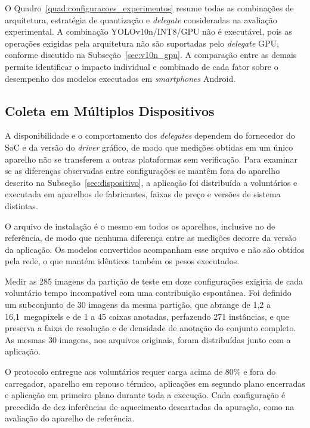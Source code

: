 \documentclass[artigo,times,capa]{iftex2024}
\begin{document}
O Quadro~\ref{quad:configuracoes_experimentos} resume todas as combinações de arquitetura, estratégia de quantização e \textit{delegate} consideradas na avaliação experimental. A combinação YOLOv10n/\ac{INT8}/\ac{GPU} não é executável, pois as operações exigidas pela arquitetura não são suportadas pelo \textit{delegate} \ac{GPU}, conforme discutido na Subseção~\ref{sec:v10n_gpu}. A comparação entre as demais permite identificar o impacto individual e combinado de cada fator sobre o desempenho dos modelos executados em \textit{smartphones} Android.

\subsection{Coleta em Múltiplos Dispositivos}
\label{sec:coleta_multidispositivo}

A disponibilidade e o comportamento dos \textit{delegates} dependem do
fornecedor do \ac{SoC} e da versão do \textit{driver} gráfico, de modo que
medições obtidas em um único aparelho não se transferem a outras plataformas
sem verificação. Para examinar se as diferenças observadas entre configurações
se mantêm fora do aparelho descrito na Subseção~\ref{sec:dispositivo}, a
aplicação foi distribuída a voluntários e executada em aparelhos de
fabricantes, faixas de preço e versões de sistema distintas.

O arquivo de instalação é o mesmo em todos os aparelhos, inclusive no de
referência, de modo que nenhuma diferença entre as medições decorre da versão
da aplicação. Os modelos convertidos acompanham esse arquivo e não são obtidos
pela rede, o que mantém idênticos também os pesos executados.

Medir as 285 imagens da partição de teste em doze configurações exigiria de
cada voluntário tempo incompatível com uma contribuição espontânea. Foi
definido um subconjunto de 30 imagens da mesma partição, que abrange de 1,2 a
16,1~megapixels e de 1 a 45 caixas anotadas, perfazendo 271 instâncias, e que
preserva a faixa de resolução e de densidade de anotação do conjunto completo.
As mesmas 30 imagens, nos arquivos originais, foram distribuídas junto com a
aplicação.

O protocolo entregue aos voluntários requer carga acima de 80\% e fora do
carregador, aparelho em repouso térmico, aplicações em segundo plano
encerradas e aplicação em primeiro plano durante toda a execução. Cada
configuração é precedida de dez inferências de aquecimento descartadas da
apuração, como na avaliação do aparelho de referência.
\end{document}

